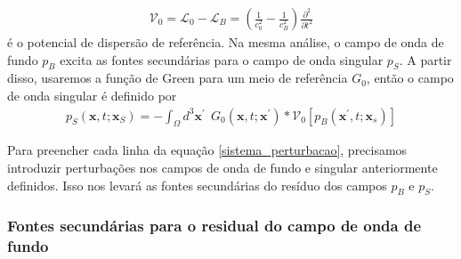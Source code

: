 \begin{eqnarray}
 \nonumber
 \mathcal{V}_{0} = \mathcal{L}_{0} - \mathcal{L}_{B} = \left(\frac{1}{c^{2}_{0}} - \frac{1}{c^{2}_{B}} \right) \frac{\partial^{2}}{\partial t^{2}}
\end{eqnarray}
é o potencial de dispersão de referência. Na mesma análise, o campo de onda de fundo $p_{B}$ excita as fontes secundárias para o campo de onda singular $p_{S}$. A partir disso, usaremos a função de Green para um meio de referência $G_{0}$, então o campo de onda singular é definido por  \\
\begin{eqnarray}
 p_{S}(\mathbf{x},t;\mathbf{x}_{S}) = - \int_{\Omega} d^{3} \mathbf{x}^{\prime}~~G_{0}(\mathbf{x},t;\mathbf{x}^{\prime}) * \mathcal{V}_{0} \left [ p_{B}(\mathbf{x}^{\prime},t;\mathbf{x}_{s}) \right]
\end{eqnarray}


Para preencher cada linha da equação \ref{sistema_perturbacao}, precisamos introduzir perturbações nos campos de onda de fundo e singular anteriormente definidos. Isso nos levará as fontes secundárias do resíduo dos campos $p_{B}$ e $p_{S}$.

\subsubsection{Fontes secundárias para o residual do campo de onda de fundo}

